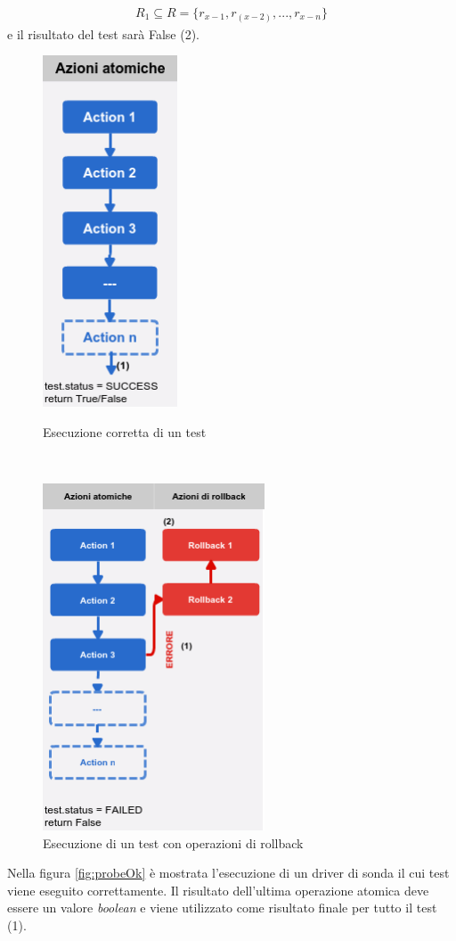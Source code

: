 \documentclass[../main.tex]{subfiles}
\begin{document}
\begin{align*}
R_1 \subseteq R =\{ r_{x-1}, r_(x-2), ... , r_{x-n}\}
\end{align*}
e il risultato del test sarà False (2).
\begin{figure}[H]
 \begin{minipage}[b]{6cm}
   \centering
   \includegraphics[width=4cm]{immagini/FlowchartProbeOk.png}
   \caption{Esecuzione corretta di un test}\label{fig:probeOk}
 \end{minipage}
 \ \hspace{2mm} \hspace{3mm} \
 \begin{minipage}[b]{9cm}
  \centering
   \includegraphics[width=6.6cm]{immagini/FlowchartProbeRollback.png}
   \caption{Esecuzione di un test con operazioni di rollback}\label{fig:probeRb}
 \end{minipage}
\end{figure}
Nella figura \ref{fig:probeOk} è mostrata l'esecuzione di un driver di sonda il cui test viene eseguito correttamente.
Il risultato dell'ultima operazione atomica deve essere un valore \textit{boolean} e viene utilizzato come risultato finale per tutto il test (1).
\end{document}
